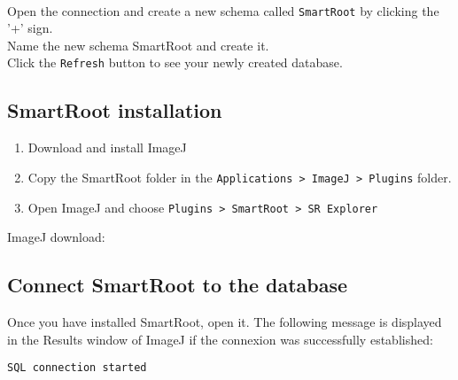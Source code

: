 \noindent
{} \\

\noindent
Open the connection and create a new schema called \verb|SmartRoot| by clicking the '+' sign.\\
Name the new schema SmartRoot and create it. \\
Click the \verb|Refresh| button to see your newly created database.


{\color{coolSubSection}\subsection{SmartRoot installation \\}}

\begin{enumerate}
\item Download and install ImageJ 
\item Copy the SmartRoot folder in the \verb|Applications > ImageJ > Plugins| folder.
\item Open ImageJ and choose \verb|Plugins > SmartRoot > SR Explorer|\\
\end{enumerate}

\noindent ImageJ download:\\

\noindent{}

\newpage
{\color{coolSubSection}\subsection{Connect SmartRoot to the database}}

Once you have installed SmartRoot, open it.
The following message is displayed in the Results window of ImageJ if the connexion was successfully established:\\

\begin{Verbatim}[frame=single, commandchars=+\(\)]
SQL connection started 
\end{Verbatim}


